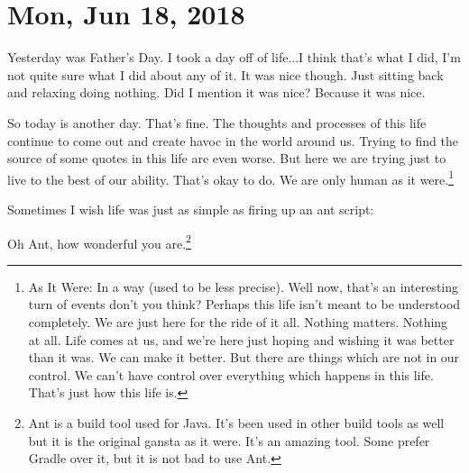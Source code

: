 \section{Mon, Jun 18, 2018}

Yesterday was Father's Day. I took a day off of life...I think that's what I
did, I'm not quite sure what I did about any of it. It was nice though. Just
sitting back and relaxing doing nothing. Did I mention it was nice? Because it
was nice.

So today is another day. That's fine. The thoughts and processes of this life
continue to come out and create havoc in the world around us. Trying to find the
source of some quotes in this life are even worse. But here we are trying just
to live to the best of our ability. That's okay to do. We are only human as it
were.\footnote{As It Were: In a way (used to be less precise). Well now, that's 
an interesting turn of events don't you think? Perhaps this life isn't meant to
be understood completely. We are just here for the ride of it all. Nothing
matters. Nothing at all. Life comes at us, and we're here just hoping and
wishing it was better than it was. We can make it better. But there are
things which are not in our control. We can't have control over everything which
happens in this life. That's just how this life is.}

Sometimes I wish life was just as simple as firing up an ant script:



Oh Ant, how wonderful you are.\footnote{
Ant is a build tool used for Java. It's been used in other build tools as well
but it is the original gansta as it were. It's an amazing tool. Some prefer
Gradle over it, but it is not bad to use Ant.
}
